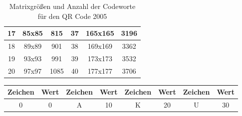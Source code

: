 \begin{appendix}
\begin{table}[htbp]
\begin{tabular}{|c|c|c|c|c|c|}
			17               & 85x85                                                            & 815                                                                          & 37               & 165x165                                                          & 3196                                                                          \\ \hline
			18               & 89x89                                                            & 901                                                                          & 38               & 169x169                                                          & 3362                                                                          \\ \hline
			19               & 93x93                                                            & 991                                                                          & 39               & 173x173                                                          & 3532                                                                          \\ \hline
			20               & 97x97                                                            & 1085                                                                         & 40               & 177x177                                                          & 3706                                                                          \\ \hline
		\end{tabular}
		\caption[Matrixgrößen und Anzahl der Codeworte für den QR Code 2005]{Matrixgrößen und Anzahl der Codeworte für den QR Code 2005\footnotemark}
		\label{tab:matrixwidth}
	\end{table}
\pagebreak
	\begin{table}[htbp]
		\centering
		\begin{tabular}{cccccccc}
			\hline
			\multicolumn{1}{|c|}{\textbf{Zeichen}} & \multicolumn{1}{c|}{\textbf{Wert}} & \multicolumn{1}{c|}{\textbf{Zeichen}} & \multicolumn{1}{c|}{\textbf{Wert}} & \multicolumn{1}{c|}{\textbf{Zeichen}} & \multicolumn{1}{c|}{\textbf{Wert}} & \multicolumn{1}{c|}{\textbf{Zeichen}} & \multicolumn{1}{c|}{\textbf{Wert}} \\ \hline
			\multicolumn{1}{|c|}{0}                & \multicolumn{1}{c|}{0}             & \multicolumn{1}{c|}{A}                & \multicolumn{1}{c|}{10}            & \multicolumn{1}{c|}{K}                & \multicolumn{1}{c|}{20}            & \multicolumn{1}{c|}{U}                & \multicolumn{1}{c|}{30}            \\ \hline

\end{tabular}
\end{table}
\end{appendix}
